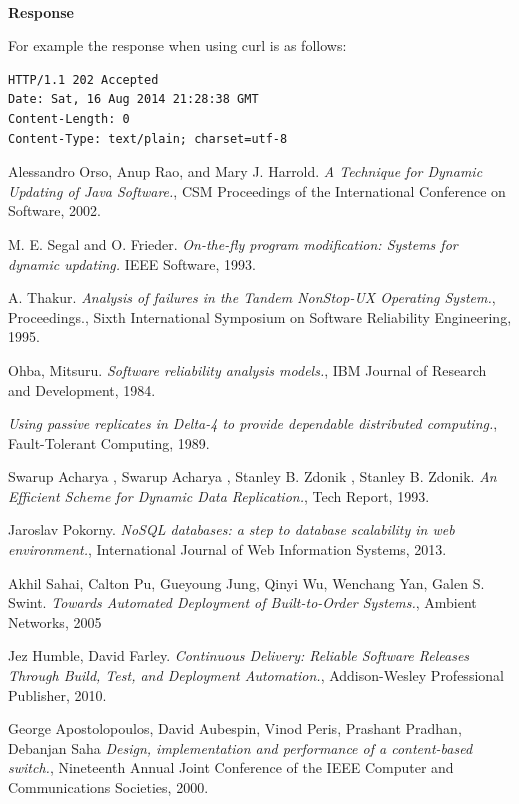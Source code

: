 \documentclass[a4paper,11pt,twoside]{report}
\begin{document}
\noindent \\
\textbf{Response}

\noindent 
For example the response when using curl is as follows:\bigskip

\begin{lstlisting}[language=terminal]
HTTP/1.1 202 Accepted
Date: Sat, 16 Aug 2014 21:28:38 GMT
Content-Length: 0
Content-Type: text/plain; charset=utf-8
\end{lstlisting}


\clearpage

\begin{thebibliography}{1}
 Alessandro Orso, Anup Rao, and Mary J. Harrold. {\em A Technique for Dynamic Updating of Java Software.}, CSM Proceedings of the International Conference on Software, 2002.
 
   M. E. Segal and O. Frieder. \textit{On-the-fly program modification: Systems for dynamic updating.} IEEE Software, 1993.

     A. Thakur. {\em Analysis of failures in the Tandem NonStop-UX Operating System.}, Proceedings., Sixth International Symposium on Software Reliability Engineering, 1995. 
   
     Ohba, Mitsuru. {\em Software reliability analysis models.}, IBM Journal of Research and Development, 1984.
    
     {\em Using passive replicates in Delta-4 to provide dependable distributed computing.}, Fault-Tolerant Computing, 1989. 
    
      Swarup Acharya , Swarup Acharya , Stanley B. Zdonik , Stanley B. Zdonik. {\em An Efficient Scheme for Dynamic Data Replication.}, Tech Report, 1993. 
   
	  Jaroslav Pokorny. {\em NoSQL databases: a step to database scalability in web environment.}, International Journal of Web Information Systems, 2013. 
	 
	 Akhil Sahai, Calton Pu, Gueyoung Jung, Qinyi Wu, Wenchang Yan, Galen S. Swint. {\em Towards Automated Deployment of Built-to-Order Systems.}, Ambient Networks, 2005  
	  
    Jez Humble, David Farley. {\em Continuous Delivery: Reliable Software Releases Through Build, Test, and Deployment Automation.}, Addison-Wesley Professional Publisher, 2010.     
   
     George Apostolopoulos, David Aubespin, Vinod Peris, Prashant Pradhan, Debanjan Saha {\em Design, implementation and performance of a content-based switch.}, Nineteenth Annual Joint Conference of the IEEE Computer and Communications Societies, 2000.
   

\end{thebibliography}
\end{document}
